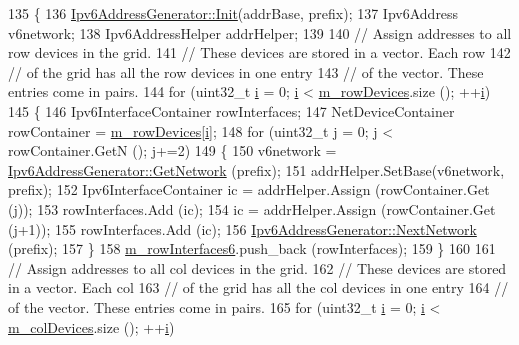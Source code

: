 \begin{DoxyCode}
135 \{
136   \hyperlink{classns3_1_1Ipv6AddressGenerator_a010449feb2e0aa103dd93abb44b6f423}{Ipv6AddressGenerator::Init}(addrBase, prefix);
137   Ipv6Address v6network;
138   Ipv6AddressHelper addrHelper;
139 
140   \textcolor{comment}{// Assign addresses to all row devices in the grid.}
141   \textcolor{comment}{// These devices are stored in a vector.  Each row }
142   \textcolor{comment}{// of the grid has all the row devices in one entry }
143   \textcolor{comment}{// of the vector.  These entries come in pairs.}
144   \textcolor{keywordflow}{for} (uint32\_t \hyperlink{bernuolliDistribution_8m_a6f6ccfcf58b31cb6412107d9d5281426}{i} = 0; \hyperlink{bernuolliDistribution_8m_a6f6ccfcf58b31cb6412107d9d5281426}{i} < \hyperlink{classns3_1_1PointToPointGridHelper_a78e6db5145507c7afec0022097c19e3a}{m\_rowDevices}.size (); ++\hyperlink{bernuolliDistribution_8m_a6f6ccfcf58b31cb6412107d9d5281426}{i})
145     \{
146       Ipv6InterfaceContainer rowInterfaces; 
147       NetDeviceContainer rowContainer = \hyperlink{classns3_1_1PointToPointGridHelper_a78e6db5145507c7afec0022097c19e3a}{m\_rowDevices}[\hyperlink{bernuolliDistribution_8m_a6f6ccfcf58b31cb6412107d9d5281426}{i}];
148       \textcolor{keywordflow}{for} (uint32\_t j = 0; j < rowContainer.GetN (); j+=2)
149         \{
150           v6network = \hyperlink{classns3_1_1Ipv6AddressGenerator_a3d153f59d37c8012186db6a18db5681c}{Ipv6AddressGenerator::GetNetwork} (prefix);
151           addrHelper.SetBase(v6network, prefix);
152           Ipv6InterfaceContainer ic = addrHelper.Assign (rowContainer.Get (j));
153           rowInterfaces.Add (ic);
154           ic = addrHelper.Assign (rowContainer.Get (j+1));
155           rowInterfaces.Add (ic);
156           \hyperlink{classns3_1_1Ipv6AddressGenerator_ad3d156d50f45026dd896e121ae04d24b}{Ipv6AddressGenerator::NextNetwork} (prefix);
157         \}
158       \hyperlink{classns3_1_1PointToPointGridHelper_a8241af071d3601364b9fa76eb0b136fc}{m\_rowInterfaces6}.push\_back (rowInterfaces);
159     \}
160 
161   \textcolor{comment}{// Assign addresses to all col devices in the grid.}
162   \textcolor{comment}{// These devices are stored in a vector.  Each col }
163   \textcolor{comment}{// of the grid has all the col devices in one entry }
164   \textcolor{comment}{// of the vector.  These entries come in pairs.}
165   \textcolor{keywordflow}{for} (uint32\_t \hyperlink{bernuolliDistribution_8m_a6f6ccfcf58b31cb6412107d9d5281426}{i} = 0; \hyperlink{bernuolliDistribution_8m_a6f6ccfcf58b31cb6412107d9d5281426}{i} < \hyperlink{classns3_1_1PointToPointGridHelper_a7466f6cdc7e0c8b2461471a6f8921192}{m\_colDevices}.size (); ++\hyperlink{bernuolliDistribution_8m_a6f6ccfcf58b31cb6412107d9d5281426}{i})

\end{DoxyCode}
